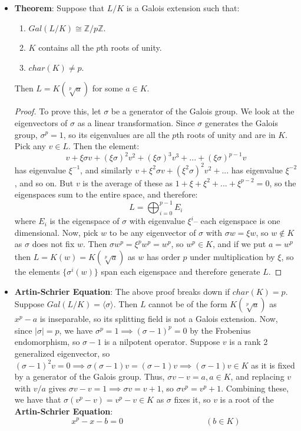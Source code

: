 \documentclass[11pt, oneside]{amsart}   	%
\theoremstyle{definition}
\begin{document}
\begin{itemize}
	\item \textbf{Theorem}: Suppose that $L / K$ is a Galois extension such that:
	
		\begin{enumerate}
		
			\item $Gal(L / K)\cong \mathbb Z / p\mathbb Z$. 
			
			\item $K$ contains all the $p$th roots of unity.
			
			\item $char(K)\neq p$.
		
		\end{enumerate}
		
		Then $L = K(\sqrt[p]{a})$ for some $a\in K$.
	
	\begin{proof}
	
		To prove this, let $\sigma$ be a generator of the Galois group. We look at the eigenvectors of $\sigma$ as a linear transformation. Since $\sigma$ 
		generates the Galois group, $\sigma^p = 1$, so its eigenvalues are all the $p$th roots of unity and are in $K$. Pick any $v\in L$. Then the 
		element:
		$$
			v + \xi\sigma v + (\xi\sigma)^2v^2 + (\xi\sigma)^3v^3 + ... + (\xi\sigma)^{p - 1}v
		$$
		has eigenvalue $\xi^{-1}$, and similarly $v + \xi^2\sigma v + (\xi^2\sigma)^2v^2 + ...$ has eigenvalue $\xi^{-2}$, and so on. But $v$ is the 
		average of these as $1 + \xi + \xi^2 + ... + \xi^{p - 2} = 0$, so the eigenspaces sum to the entire space, and therefore:
		$$
			L = \bigoplus_{i = 0}^{p - 1}E_i
		$$
		where $E_i$ is the eigenspace of $\sigma$ with eigenvalue $\xi^i$-- each eigenspace is one dimensional. Now, pick $w$ to be any eigenvector 
		of $\sigma$ with $\sigma w = \xi w$, so $w\not\in K$ as $\sigma$ does not fix $w$. Then $\sigma w^p = \xi^p w^p = w^p$, so $w^p\in K$, 
		and if we put $a = w^p$ then $L = K(w) = K(\sqrt[p]{a})$ as $w$ has order $p$ under multiplication by $\xi$, so the elements $\{\sigma^i(w)\}$ 
		span each eigenspace and therefore generate $L$.
		
	\end{proof}
		
	\item \textbf{Artin-Schrier Equation}: The above proof breaks down if $char(K) = p$. Suppose $Gal(L / K) = \langle\sigma\rangle$. Then 
	$L$ cannot be of the form $K(\sqrt[p]{a})$ as $x^p - a$ is inseparable, so its splitting field is not a Galois extension. Now, since $|\sigma| = p$, we have 
	$\sigma^p = 1\implies (\sigma - 1)^p = 0$ by the Frobenius endomorphism, so $\sigma - 1$ is a nilpotent operator. Suppose $v$ is a rank 2 generalized 
	eigenvector, so $(\sigma - 1)^2 v = 0\implies \sigma(\sigma - 1)v = (\sigma - 1) v\implies (\sigma - 1) v\in K$ as it is fixed by a generator of the Galois 
	group. Thus, $\sigma v - v = a, a\in K$, and replacing $v$ with $v / a$ gives $\sigma v - v = 1\implies \sigma v = v + 1$, so $\sigma v^p = v^p + 1$. 
	Combining these, we have that $\sigma(v^p - v) = v^p - v\in K$ as $\sigma$ fixes it, so $v$ is a root of the \textbf{Artin-Schrier Equation}:
	$$
		x^p - x - b = 0\;\;\;\;\;\;\;\;\;\;\;\;\;\;\;\;\;\;\;\;\;\;\;\;\;\;\;\;\;\;\;\;\;\;\;\; (b\in K)
	$$
	

\end{itemize}
\end{document}
